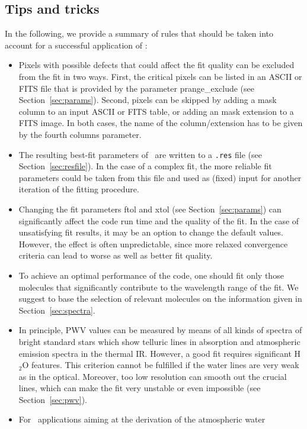 \subsection{Tips and tricks}\label{sec:tips}
In the following, we provide a summary of rules that should be taken into
account for a successful application of \mf:
\begin{itemize}
\item Pixels with possible defects that could affect the fit quality can be
excluded from the fit in two ways. First, the critical pixels can be listed
in an ASCII or FITS file that is provided by the parameter
{\sc prange\_exclude} (see Section~\ref{sec:params}). Second, pixels can be
skipped by adding a mask column to an input ASCII or FITS table, or adding an
mask extension to a FITS image. In both cases, the name of the column/extension
has to be given by the fourth {\sc columns} parameter.
\item The resulting best-fit parameters of \mf\ are written to a {\tt .res}
file (see Section~\ref{sec:resfile}). In the case of a complex fit, the more
reliable fit parameters could be taken from this file and used as (fixed) input
for another iteration of the fitting procedure.
\item Changing the fit parameters {\sc ftol} and {\sc xtol} (see
Section~\ref{sec:params}) can significantly affect the code run time and the
quality of the fit. In the case of unsatisfying fit results, it may be an
option to change the default values. However, the effect is often
unpredictable, since more relaxed convergence criteria can lead to worse as
well as better fit quality.
\item To achieve an optimal performance of the code, one should fit only those
molecules that significantly contribute to the wavelength range of the fit. We
suggest to base the selection of relevant molecules on the information given in
Section~\ref{sec:spectra}.
\item In principle, PWV values can be measured by means of all kinds of spectra
of bright standard stars which show telluric lines in absorption and
atmospheric emission spectra in the thermal IR. However, a good fit requires
significant H$_2$O features. This criterion cannot be fulfilled if the water
lines are very weak as in the optical. Moreover, too low resolution can smooth
out the crucial lines, which can make the fit very unstable or even impossible
(see Section~\ref{sec:pwv}).
\item For \mf\ applications aiming at the derivation of the atmospheric water

\end{itemize}
